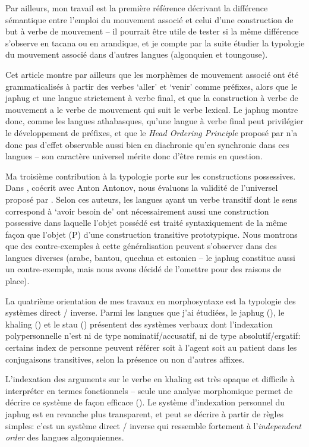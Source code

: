 \documentclass[oldfontcommands,oneside,a4paper,11pt]{article}
\begin{document}
 Par ailleurs, mon travail est la première référence décrivant la différence sémantique entre l'emploi du mouvement associé et celui d'une construction de but à verbe de mouvement -- il pourrait être utile de tester si la même différence s'observe en tacana ou en arandique, et je compte par la suite étudier la typologie du mouvement associé dans d'autres langues (algonquien et toungouse).

Cet article montre par ailleurs que les morphèmes de mouvement associé ont été grammaticalisés à partir des verbes `aller' et `venir' comme préfixes, alors que le japhug et une langue strictement à verbe final, et que la construction à verbe de mouvement a le verbe de mouvement qui suit le verbe lexical. Le japhug montre donc, comme les langues athabasques, qu'une langue à verbe final peut privilégier le développement de préfixes, et que le \textit{Head Ordering Principle} proposé par \citet{hawkins88prefixing} n'a donc pas d'effet observable aussi bien en diachronie qu'en synchronie dans ces langues -- son caractère universel mérite donc d'être remis en question. 

Ma troisième contribution à la typologie porte sur les constructions possessives. Dans \citet{antonov14need}, coécrit avec Anton Antonov, nous évaluons la validité de l'universel proposé par \citet{harves12need}. Selon ces auteurs, les langues ayant un verbe transitif dont le sens correspond à `avoir besoin de' ont nécessairement aussi une construction possessive dans laquelle l'objet possédé est traité syntaxiquement de la même façon que l'objet (P) d'une construction transitive prototypique. Nous montrons que des contre-exemples à cette généralisation peuvent s'observer dans des langues diverses (arabe, bantou, quechua et estonien -- le japhug constitue aussi un contre-exemple, mais nous avons décidé de l'omettre pour des raisons de place). 
 
 La quatrième orientation de mes travaux en morphosyntaxe est la typologie des systèmes direct / inverse. Parmi les langues que j'ai étudiées, le japhug (\citealt{jacques10inverse}), le khaling (\citealt{jacques12khaling}) et le stau  (\citealt{jacques14rtau}) présentent des systèmes verbaux dont l'indexation polypersonnelle n'est ni de type nominatif/accusatif, ni de type absolutif/ergatif: certains index de personne  peuvent référer soit à l'agent soit au patient dans les conjugaisons transitives, selon la présence ou non d'autres affixes.
 
 L'indexation des arguments sur le verbe en khaling est très opaque et difficile à interpréter en termes fonctionnels -- seule une analyse morphomique permet de décrire ce système de façon efficace (\citealt{walther14compactness}). Le système d'indexation personnel du  japhug est en revanche plus transparent, et peut se décrire à partir de règles simples: c'est un système direct / inverse qui ressemble fortement à l'\textit{independent order} des langues algonquiennes.  
 
\end{document}
